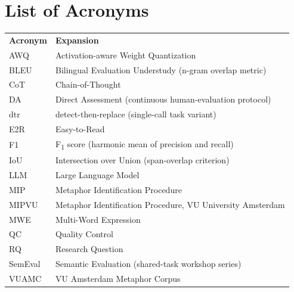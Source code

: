 \section*{List of Acronyms}
{}

\begin{center}
\begin{tabular}{ll}
\textbf{Acronym} & \textbf{Expansion} \\[2pt]
AWQ      & Activation-aware Weight Quantization \\
BLEU     & Bilingual Evaluation Understudy (n-gram overlap metric) \\
CoT      & Chain-of-Thought \\
DA       & Direct Assessment (continuous human-evaluation protocol) \\
dtr      & detect-then-replace (single-call task variant) \\
E2R      & Easy-to-Read \\
F1       & F\textsubscript{1} score (harmonic mean of precision and recall) \\
IoU      & Intersection over Union (span-overlap criterion) \\
LLM      & Large Language Model \\
MIP      & Metaphor Identification Procedure \\
MIPVU    & Metaphor Identification Procedure, VU University Amsterdam \\
MWE      & Multi-Word Expression \\
QC       & Quality Control \\
RQ       & Research Question \\
SemEval  & Semantic Evaluation (shared-task workshop series) \\
VUAMC    & VU Amsterdam Metaphor Corpus \\
\end{tabular}
\end{center}

\newpage
